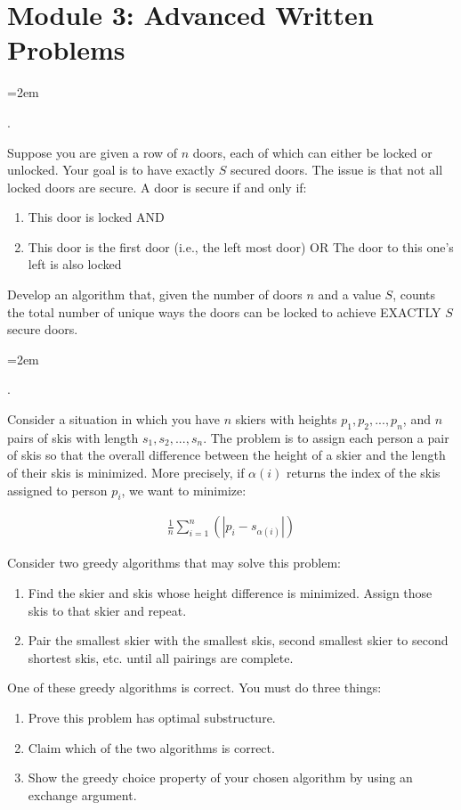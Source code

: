 \documentclass[12pt]{article}
\def\homework{Module 3: Advanced Written Problems}
\newcounter{quesnum}
\newcommand{\question}[2][??]{
\begin{list}{\labelitemi}{\leftmargin=2em}
\item [\arabic{quesnum}.]  {#2}
\end{list}
\addtocounter{quesnum}{1}
}
\newcommand{\answer}[2][??]{ 
\ifthenelse{\boolean{solution}}{
\color{red} #2 \color{black}}
{\vspace*{#1}}
}
\begin{document}
\section*{\homework}



\question[3]{
Suppose you are given a row of $n$ doors, each of which can either be locked or unlocked. Your goal is to have exactly $S$ secured doors. The issue is that not all locked doors are secure. A door is secure if and only if:

\begin{enumerate}
\item This door is locked AND
\item This door is the first door (i.e., the left most door) OR The door to this one's left is also locked
\end{enumerate}

Develop an algorithm that, given the number of doors $n$ and a value $S$, counts the total number of unique ways the doors can be locked to achieve EXACTLY $S$ secure doors.
}

\answer[0 in]{
...
}



\question[2]{
Consider a situation in which you have $n$ skiers with heights $p_1,p_2,...,p_n$, and $n$ pairs of skis with length $s_1,s_2,...,s_n$. The problem is to assign each person a pair of skis so that the overall difference between the height of a skier and the length of their skis is minimized. More precisely, if $\alpha(i)$ returns the index of the skis assigned to person $p_i$, we want to minimize:

\begin{align*}
\frac{1}{n}\sum_{i=1}^{n}(|p_i - s_{\alpha(i)}|)
\end{align*}

Consider two greedy algorithms that may solve this problem:

\begin{enumerate}
\item Find the skier and skis whose height difference is minimized. Assign those skis to that skier and repeat.
\item Pair the smallest skier with the smallest skis, second smallest skier to second shortest skis, etc. until all pairings are complete.
\end{enumerate}

One of these greedy algorithms is correct. You must do three things:

\begin{enumerate}
\item Prove this problem has optimal substructure.
\item Claim which of the two algorithms is correct.
\item Show the greedy choice property of your chosen algorithm by using an exchange argument.
\end{enumerate}
}
\end{document}
